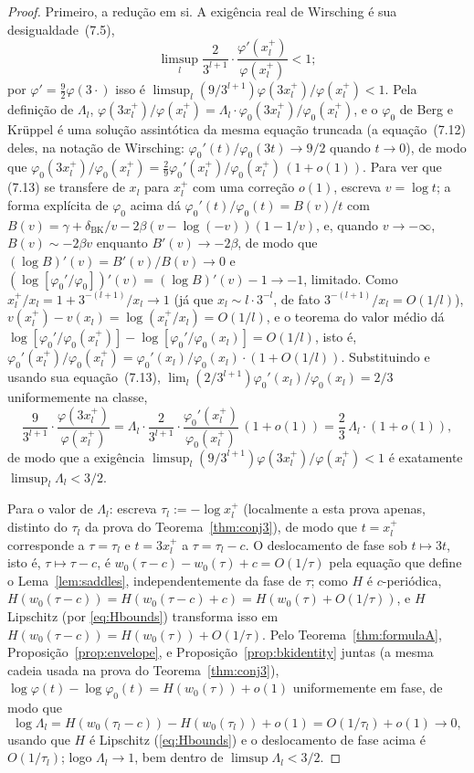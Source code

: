 \documentclass[11pt]{amsart}
\theoremstyle{plain}
\theoremstyle{definition}
\theoremstyle{remark}
\begin{document}
\begin{proof}
Primeiro, a redução em si. A exigência real de Wirsching é sua desigualdade~(7.5),
\[
\limsup_l \frac{2}{3^{l+1}}\cdot\frac{\varphi'(x_l^+)}{\varphi(x_l^+)} < 1;
\]
por $\varphi'=\tfrac92\varphi(3\cdot)$ isso é $\limsup_l (9/3^{l+1})\varphi(3x_l^+)/\varphi(x_l^+) <
1$. Pela definição de $\Lambda_l$,
$\varphi(3x_l^+)/\varphi(x_l^+) = \Lambda_l\cdot\varphi_0(3x_l^+)/\varphi_0(x_l^+)$, e o $\varphi_0$
de Berg e Kr\"uppel é uma solução assintótica da mesma equação truncada (a equação~(7.12) deles, na
notação de Wirsching: $\varphi_0'(t)/\varphi_0(3t)\to9/2$ quando $t\to0$), de modo que
$\varphi_0(3x_l^+)/\varphi_0(x_l^+) = \tfrac29\varphi_0'(x_l^+)/\varphi_0(x_l^+)\,(1+o(1))$.
Para ver que (7.13) se transfere de $x_l$ para $x_l^+$ com uma correção $o(1)$, escreva $v=\log t$;
a forma explícita de $\varphi_0$ acima dá $\varphi_0'(t)/\varphi_0(t) = B(v)/t$ com
$B(v) = \gamma+\delta_{\mathrm{BK}}/v-2\beta(v-\log(-v))(1-1/v)$, e, quando $v\to-\infty$,
$B(v)\sim-2\beta v$ enquanto $B'(v)\to-2\beta$, de modo que $(\log B)'(v)=B'(v)/B(v)\to0$ e
$(\log[\varphi_0'/\varphi_0])'(v) = (\log B)'(v)-1 \to -1$, limitado. Como
$x_l^+/x_l = 1+3^{-(l+1)}/x_l \to 1$ (já que $x_l\sim l\cdot3^{-l}$, de fato
$3^{-(l+1)}/x_l=O(1/l)$), $v(x_l^+)-v(x_l)=\log(x_l^+/x_l)=O(1/l)$, e o teorema do valor médio dá
$\log[\varphi_0'/\varphi_0(x_l^+)]-\log[\varphi_0'/\varphi_0(x_l)]=O(1/l)$, isto é,
$\varphi_0'(x_l^+)/\varphi_0(x_l^+)=\varphi_0'(x_l)/\varphi_0(x_l)\cdot(1+O(1/l))$. Substituindo e
usando sua equação~(7.13), $\lim_l(2/3^{l+1})\varphi_0'(x_l)/\varphi_0(x_l)=2/3$ uniformemente na
classe,
\[
\frac{9}{3^{l+1}}\cdot\frac{\varphi(3x_l^+)}{\varphi(x_l^+)}
= \Lambda_l\cdot\frac2{3^{l+1}}\cdot\frac{\varphi_0'(x_l^+)}{\varphi_0(x_l^+)}\,(1+o(1))
= \frac23\,\Lambda_l\cdot(1+o(1)),
\]
de modo que a exigência $\limsup_l(9/3^{l+1})\varphi(3x_l^+)/\varphi(x_l^+)<1$ é exatamente
$\limsup_l\Lambda_l<3/2$.

Para o valor de $\Lambda_l$: escreva $\tau_l := -\log x_l^+$ (localmente a esta prova apenas,
distinto do $\tau_l$ da prova do Teorema~\ref{thm:conj3}), de modo que $t=x_l^+$ corresponde a
$\tau=\tau_l$ e $t=3x_l^+$ a $\tau=\tau_l-c$. O deslocamento de fase sob $t\mapsto3t$, isto é,
$\tau\mapsto\tau-c$, é $w_0(\tau-c)-w_0(\tau)+c = O(1/\tau)$ pela equação que define o
Lema~\ref{lem:saddles}, independentemente da fase de $\tau$; como $H$ é $c$-periódica,
$H(w_0(\tau-c)) = H(w_0(\tau-c)+c) = H(w_0(\tau)+O(1/\tau))$, e $H$ Lipschitz (por
\eqref{eq:Hbounds}) transforma isso em $H(w_0(\tau-c)) = H(w_0(\tau)) + O(1/\tau)$. Pelo
Teorema~\ref{thm:formulaA}, Proposição~\ref{prop:envelope}, e Proposição~\ref{prop:bkidentity}
juntas (a mesma cadeia usada na prova do Teorema~\ref{thm:conj3}),
$\log\varphi(t)-\log\varphi_0(t) = H(w_0(\tau)) + o(1)$ uniformemente em fase, de modo que
\[
\log\Lambda_l = H(w_0(\tau_l-c)) - H(w_0(\tau_l)) + o(1) = O(1/\tau_l) + o(1) \to 0,
\]
usando que $H$ é Lipschitz (\eqref{eq:Hbounds}) e o deslocamento de fase acima é $O(1/\tau_l)$;
logo $\Lambda_l \to 1$, bem dentro de $\limsup \Lambda_l < 3/2$.
\end{proof}
\end{document}

